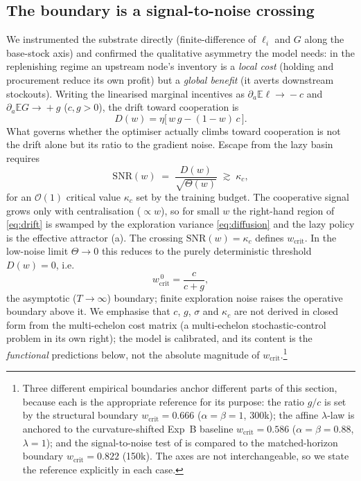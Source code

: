 \documentclass[11pt]{article}
\newcommand{\wcrit}{w_{\mathrm{crit}}}
\begin{document}
\subsection{The boundary is a signal-to-noise crossing}
We instrumented the substrate directly (finite-difference of $\ell_i$ and
$G$ along the base-stock axis) and confirmed the qualitative asymmetry the
model needs: in the replenishing regime an upstream node's inventory is a
\emph{local cost} (holding and procurement reduce its own profit) but a
\emph{global benefit} (it averts downstream stockouts). Writing the
linearised marginal incentives as $\partial_a\mathbb{E}\ell\!\to\!-c$ and
$\partial_a\mathbb{E}G\!\to\!+g$ ($c,g>0$), the drift toward cooperation is
\begin{equation}
  D(w)=\eta\big[\,w\,g-(1-w)\,c\,\big].
  \label{eq:drift}
\end{equation}
What governs whether the optimiser actually climbs toward cooperation is
not the drift alone but its ratio to the gradient noise. Escape from the
lazy basin requires
\begin{equation}
  \mathrm{SNR}(w)\;=\;\frac{D(w)}{\sqrt{\Theta(w)}}\;\gtrsim\;\kappa_c ,
  \label{eq:snr}
\end{equation}
for an $\mathcal{O}(1)$ critical value $\kappa_c$ set by the training
budget. The cooperative signal grows only with centralisation
($\propto w$), so for small $w$ the right-hand region of \eqref{eq:drift}
is swamped by the exploration variance \eqref{eq:diffusion} and the lazy
policy is the effective attractor (a). The crossing
$\mathrm{SNR}(w)=\kappa_c$ defines $\wcrit$. In the low-noise limit
$\Theta\!\to\!0$ this reduces to the purely deterministic threshold
$D(w)=0$, i.e.
\begin{equation}
  \wcrit^{\,0}=\frac{c}{c+g},
  \label{eq:wcrit}
\end{equation}
the asymptotic ($T\!\to\!\infty$) boundary; finite exploration noise raises
the operative boundary above it. We emphasise that $c$, $g$, $\sigma$ and
$\kappa_c$ are not derived in closed form from the multi-echelon cost
matrix (a multi-echelon stochastic-control problem in its own right); the
model is calibrated, and its content is the \emph{functional} predictions
below, not the absolute magnitude of $\wcrit$.\footnote{%
  Three different empirical boundaries anchor different parts of this
  section, because each is the appropriate reference for its purpose: the
  ratio $g/c$ is set by the structural boundary $\wcrit{=}0.666$
  ($\alpha{=}\beta{=}1$, 300k); the affine $\lambda$-law is anchored to the
  curvature-shifted Exp~B baseline $\wcrit{=}0.586$ ($\alpha{=}\beta{=}0.88$,
  $\lambda{=}1$); and the signal-to-noise test of 
  is compared to the matched-horizon boundary $\wcrit{=}0.822$ (150k). The
  axes are not interchangeable, so we state the reference explicitly in each
  case.}
\end{document}
